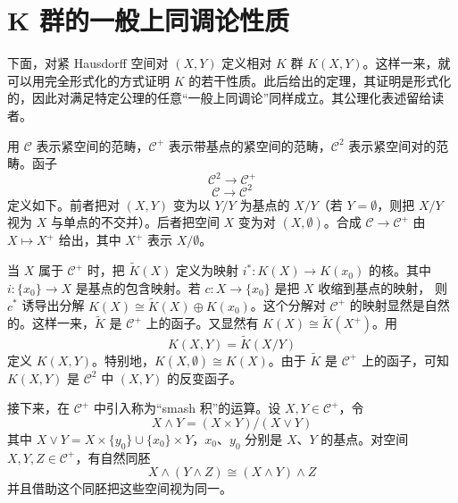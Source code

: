 

\section{K 群的一般上同调论性质}

下面，对紧 Hausdorff 空间对 $(X,Y)$ 定义相对 $K$ 群 $K(X,Y)$。这样一来，就可以用完全形式化的方式证明 $K$ 的若干性质。此后给出的定理，其证明是形式化的，因此对满足特定公理的任意“一般上同调论”同样成立。其公理化表述留给读者。

用 $\mathcal{C}$ 表示紧空间的范畴，$\mathcal{C}^+$ 表示带基点的紧空间的范畴，$\mathcal{C}^2$ 表示紧空间对的范畴。函子
\[
\mathcal{C}^2\longrightarrow\mathcal{C}^+
\]
\[
\mathcal{C}\longrightarrow\mathcal{C}^2
\]
定义如下。前者把对 $(X,Y)$ 变为以 $Y/Y$ 为基点的 $X/Y$（若 $Y=\emptyset$，则把 $X/Y$ 视为 $X$ 与单点的不交并）。后者把空间 $X$ 变为对 $(X,\emptyset)$。合成 $\mathcal{C}\to\mathcal{C}^+$ 由 $X\mapsto X^+$ 给出，其中 $X^+$ 表示 $X/\emptyset$。

当 $X$ 属于 $\mathcal{C}^+$ 时，把 $\tilde K(X)$ 定义为映射 $i^*\colon K(X)\to K(x_0)$ 的核。其中 $i\colon\{x_0\}\to X$ 是基点的包含映射。若 $c\colon X\to\{x_0\}$ 是把 $X$ 收缩到基点的映射，
则 $c^*$ 诱导出分解 $K(X)\cong\tilde K(X)\oplus K(x_0)$。这个分解对 $\mathcal{C}^+$ 的映射显然是自然的。这样一来，$\tilde K$ 是 $\mathcal{C}^+$ 上的函子。又显然有 $K(X)\cong\tilde K(X^+)$。用
\[
K(X,Y)=\tilde K(X/Y)
\]
定义 $K(X,Y)$。特别地，$K(X,\emptyset)\cong K(X)$。由于 $\tilde K$ 是 $\mathcal{C}^+$ 上的函子，可知 $K(X,Y)$ 是 $\mathcal{C}^2$ 中 $(X,Y)$ 的反变函子。


接下来，在 $\mathcal{C}^+$ 中引入称为“smash 积”的运算。设 $X,Y\in\mathcal{C}^+$，令
\[
X\wedge Y=(X\times Y)/(X\vee Y)
\]
其中 $X\vee Y=X\times\{y_0\}\cup\{x_0\}\times Y$，$x_0$、$y_0$ 分别是 $X$、$Y$ 的基点。对空间 $X,Y,Z\in\mathcal{C}^+$，有自然同胚
\[
X\wedge(Y\wedge Z)\cong(X\wedge Y)\wedge Z
\]
并且借助这个同胚把这些空间视为同一。

